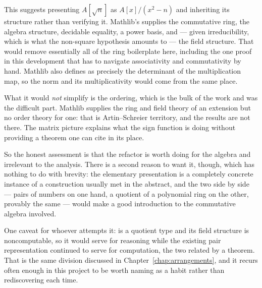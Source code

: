 This suggests presenting $A[\sqrt{n}]$ as $A[x]/(x^2 - n)$ and inheriting its
structure rather than verifying it. Mathlib's  supplies the
commutative ring, the algebra structure, decidable equality, a power basis, and
--- given irreducibility, which is what the non-square hypothesis amounts to ---
the field structure. That would remove essentially all of the ring boilerplate
here, including the one proof in this development that has to navigate
associativity and commutativity by hand. Mathlib also defines 
as precisely the determinant of the multiplication map, so the norm and its
multiplicativity would come from the same place.


What it would \emph{not} simplify is the ordering, which is the bulk of the work
and was the difficult part. Mathlib supplies the ring and field theory of an
extension but no order theory for one: that is Artin--Schreier territory, and
the results are not there. The matrix picture explains what the sign function is
doing without providing a theorem one can cite in its place.

So the honest assessment is that the refactor is worth doing for the algebra and
irrelevant to the analysis. There is a second reason to want it, though, which
has nothing to do with brevity: the elementary presentation is a completely
concrete instance of a construction usually met in the abstract, and the two
side by side --- pairs of numbers on one hand, a quotient of a polynomial ring
on the other, provably the same --- would make a good introduction to the
commutative algebra involved.

One caveat for whoever attempts it:  is a quotient type and its
field structure is noncomputable, so it would serve for reasoning while the
existing pair representation continued to serve for computation, the two related
by a theorem. That is the same division discussed in
Chapter~\ref{chap:arrangements}, and it recurs often enough in this project to
be worth naming as a habit rather than rediscovering each time.

